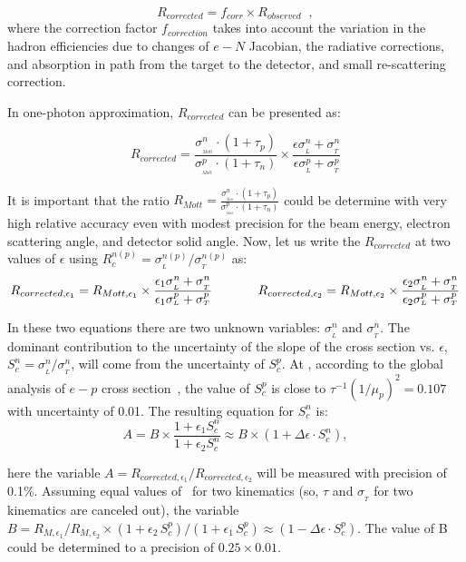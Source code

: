 \begin{equation}
R_{corrected} = f_{corr} \times R_{observed} \;\; ,
\label{eq:2}
\end{equation}
where the correction factor $f_{correction}$ takes into account the variation in the hadron efficiencies due to changes of $e-N$ Jacobian, the radiative corrections, and absorption in path
from the target to the detector, and small re-scattering correction.

In one-photon approximation, $R_{corrected}$ can be presented as: 

\begin{equation}
R_{corrected} = \frac {\sigma_{_{_{Mott}}}^n \cdot (1+\tau_p)}{\sigma_{_{_{Mott}}}^p \cdot (1+\tau_n)} \times \frac{\epsilon \sigma_{_L}^n + \sigma_{_T}^n}{\epsilon \sigma_{_L}^p + \sigma_{_T}^p}
\end{equation}

It is important that the ratio $R_{Mott} = \frac {\sigma_{_{_{Mott}}}^n \cdot (1+\tau_p)}{\sigma_{_{_{Mott}}}^p \cdot (1+\tau_n)}$ could be determine with very high relative accuracy even with modest precision for the beam energy, electron scattering angle, and detector solid angle. 
Now, let us write the $R_{corrected}$ at two values of $\epsilon$ using $R_c^{n(p)} = \sigma_{_L}^{n(p)}/ \sigma_{_T}^{n(p)}$ as:
\begin{equation*}
R_{{corrected},\epsilon_1} = R_{Mott,\epsilon_1} \times \frac{\epsilon_1 \sigma_{_L}^n + \sigma_{_T}^n}{\epsilon_1 \sigma_{_L}^p + \sigma_{_T}^p}
\hskip .5 in
R_{{corrected},\epsilon_2} = R_{Mott,\epsilon_2} \times \frac{\epsilon_2 \sigma_{_L}^n + \sigma_{_T}^n}{\epsilon_2 \sigma_{_L}^p + \sigma_{_T}^p}
\end{equation*}

In these two equations there are two unknown variables: $\sigma_{_L}^n$ and $\sigma_{_T}^n$.
The dominant contribution to the uncertainty of the slope of the cross section vs. $\epsilon$,  
$S_c^n = \sigma_{_L}^n/ \sigma_{_T}^n$, will come from the uncertainty of $S_c^p$.
At  \gevcsq, according to the global analysis of $e-p$ cross section~\cite{Christy2020ab}, the value of $S_c^p$ is close to $\tau^{-1}(1/\mu_p)^2 = 0.107$ with uncertainty of 0.01.
The resulting equation for $S_c^n$ is:
\begin{equation*}
A = B \times \frac{1 + \epsilon_1 S_c^n}{1 + \epsilon_2 S_c^n} \approx B \times (1 +  \Delta \epsilon \cdot S_c^n),
\end{equation*}

here the variable $A = R_{{corrected},\epsilon_1}/R_{{corrected},\epsilon_2}$ will be measured with precision of 0.1\%.  Assuming equal values of \qsq~for two kinematics (so, $\tau$ and $\sigma_{_T}$ for two kinematics are canceled out), the variable
\mbox{$ B = {R_{M,\epsilon_1}}/{R_{M,\epsilon_2}} \times (1+ \epsilon_2 \, S_c^p)/( 1 + \epsilon_1 \, S_c^p) \approx (1 - \Delta \epsilon \cdot S_c^p)$}.
The value of B could be determined to a precision of $0.25 \times 0.01$.
 

